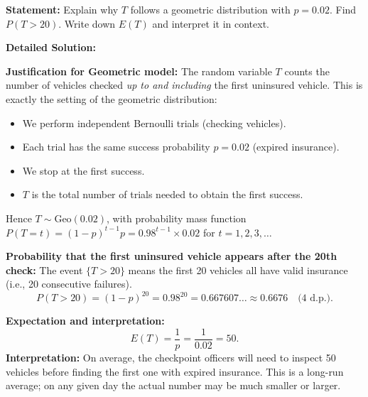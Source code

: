 \documentclass[11pt]{article}
\begin{document}
\begin{exoresolu}
\textbf{Statement:} Explain why $T$ follows a geometric distribution with $p = 0.02$. Find $P(T > 20)$. Write down $E(T)$ and interpret it in context.

\tcblower
\textbf{Detailed Solution:}

\textbf{Justification for Geometric model:}
The random variable $T$ counts the number of vehicles checked \emph{up to and including} the first uninsured vehicle. This is exactly the setting of the geometric distribution:
\begin{itemize}
\item We perform independent Bernoulli trials (checking vehicles).
\item Each trial has the same success probability $p = 0.02$ (expired insurance).
\item We stop at the first success.
\item $T$ is the total number of trials needed to obtain the first success.
\end{itemize}
Hence $T \sim \mathrm{Geo}(0.02)$, with probability mass function $P(T = t) = (1-p)^{t-1}p = 0.98^{t-1} \times 0.02$ for $t = 1, 2, 3, \ldots$

\textbf{Probability that the first uninsured vehicle appears after the 20th check:}
The event $\{T > 20\}$ means the first 20 vehicles all have valid insurance (i.e., 20 consecutive failures).
\[
P(T > 20) = (1-p)^{20} = 0.98^{20} = 0.667607\ldots \approx 0.6676 \quad \text{(4 d.p.)}.
\]

\textbf{Expectation and interpretation:}
\[
E(T) = \frac{1}{p} = \frac{1}{0.02} = 50.
\]
\textbf{Interpretation:} On average, the checkpoint officers will need to inspect 50 vehicles before finding the first one with expired insurance. This is a long-run average; on any given day the actual number may be much smaller or larger.
\end{exoresolu}
\end{document}
